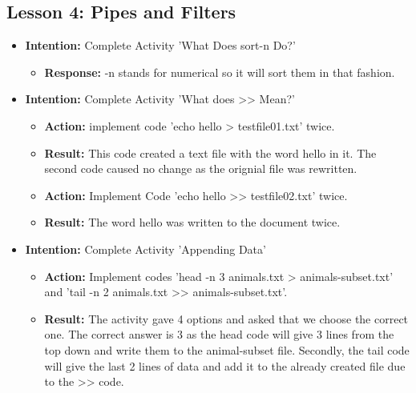 \documentclass{article}
\begin{document}
\subsection{Lesson 4: Pipes and Filters}
\date{16:30 1/09/2019}
\begin{itemize}

\item{\textbf{Intention:} Complete Activity 'What Does sort-n Do?'}
\begin{itemize}

\item{\textbf{Response:} -n stands for numerical so it will sort them in that fashion.}

\end{itemize}

\item{\textbf{Intention:} Complete Activity 'What does >> Mean?'}

\begin{itemize}
\item{\textbf{Action:} implement code 'echo hello > testfile01.txt' twice.}

\item{\textbf{Result:} This code created a text file with the word hello in it. The second code caused no change as the orignial file was rewritten.}

\item{\textbf{Action:} Implement Code 'echo hello >> testfile02.txt' twice.}

\item{\textbf{Result:} The word hello was written to the document twice.}

\end{itemize}

\item{\textbf{Intention:} Complete Activity 'Appending Data'}

\begin{itemize}
\item{\textbf{Action:} Implement codes 'head -n 3 animals.txt > animals-subset.txt' and 'tail -n 2 animals.txt >> animals-subset.txt'.}

\item{\textbf{Result:} The activity gave 4 options and asked that we choose the correct one. The correct answer is 3 as the head code will give 3 lines from the top down and write them to the animal-subset file. Secondly, the tail code will give the last 2 lines of data and add it to the already created file due to the >> code.}


\end{itemize}
\end{itemize}
\end{document}
